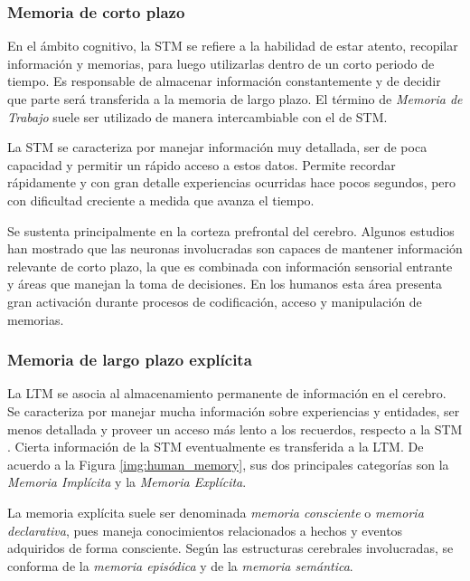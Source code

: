 

\subsubsection{Memoria de corto plazo}
En el ámbito cognitivo, la STM se refiere a la habilidad de estar atento, recopilar información  y memorias, para luego utilizarlas dentro de un corto periodo de tiempo. Es responsable de almacenar información constantemente y de decidir que parte será transferida a la memoria de largo plazo. El término de \textit{Memoria de Trabajo} suele ser utilizado de manera intercambiable con el de STM.

La STM se caracteriza por manejar información muy detallada, ser de poca capacidad y permitir un rápido acceso a estos datos. Permite recordar rápidamente y con gran detalle experiencias ocurridas hace pocos segundos, pero con dificultad creciente a medida que avanza el tiempo.

Se sustenta principalmente en la corteza prefrontal del cerebro. Algunos estudios han mostrado que las neuronas involucradas son capaces de mantener información relevante de corto plazo, la que es combinada con información sensorial entrante y áreas que manejan la toma de decisiones. %
En los humanos esta área presenta gran activación durante procesos de codificación, acceso y manipulación de memorias. %


\subsubsection{Memoria de largo plazo explícita}

La LTM se asocia al almacenamiento permanente de información en el cerebro. Se caracteriza por manejar mucha información sobre experiencias y entidades, ser menos detallada y proveer un acceso más lento a los recuerdos, respecto a la STM \cite{Eichenbaum:2008}. Cierta información de la STM eventualmente es transferida a la LTM. De acuerdo a la Figura \ref{img:human_memory}, sus dos principales categorías son la \textit{Memoria Implícita} y la \textit{Memoria Explícita}.

La memoria explícita suele ser denominada \textit{memoria consciente} o \textit{memoria declarativa}, pues maneja conocimientos relacionados a hechos y eventos adquiridos de forma consciente. Según las estructuras cerebrales involucradas, se conforma de la \textit{memoria episódica} y de la \textit{memoria semántica}.

